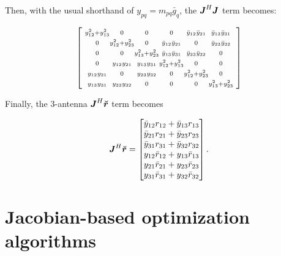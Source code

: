\documentclass[useAMS,usenatbib]{mn2e}
\newcommand{\mat}[1]{{\bmath{#1}}}
\newcommand{\JJ}{\mat{J}} %
\begin{document}
Then, with the usual shorthand of $y_{pq} = m_{pq} \bar{g}_q$, the
$\JJ^H\JJ$ term becomes:

\begin{equation}
\label{eq:JHJ:3ant}
\Matrix{@{~}c@{}c@{}c@{}c@{}c@{}c@{~}}{
\scriptstyle\yysq{12}{13} &\scriptstyle 0             &\scriptstyle 0             &\scriptstyle 0             &\scriptstyle \bb{1}{2}       &\scriptstyle \bb{1}{3} \\
\scriptstyle0             &\scriptstyle \yysq{12}{23} &\scriptstyle 0             &\scriptstyle \bb{1}{2}       &\scriptstyle 0             &\scriptstyle \bb{2}{3} \\
\scriptstyle0             &\scriptstyle 0             &\scriptstyle \yysq{13}{23} &\scriptstyle \bb{1}{3}       &\scriptstyle \bb{2}{3}       &\scriptstyle 0       \\
\scriptstyle0             &\scriptstyle \bbb{1}{2}      &\scriptstyle \bbb{1}{3}      &\scriptstyle \yysq{12}{13} &\scriptstyle 0             &\scriptstyle 0       \\ 
\scriptstyle\bbb{1}{2}      &\scriptstyle 0             &\scriptstyle \bbb{2}{3}      &\scriptstyle 0             &\scriptstyle \yysq{12}{23} &\scriptstyle 0 \\
\scriptstyle\bbb{1}{3}      &\scriptstyle \bbb{2}{3}      &\scriptstyle 0             &\scriptstyle 0             &\scriptstyle 0             &\scriptstyle  \yysq{13}{23} \\
}
\end{equation}

Finally, the 3-antenna $\JJ^H\Rr$ term becomes

\begin{equation}
\label{eq:JHR:3ant}
\JJ^H\Rr = \Matrix{c}{
\bar{y}_{12} r_{12} + \bar{y}_{13} r_{13} \\
\bar{y}_{21} r_{21} + \bar{y}_{23} r_{23} \\
\bar{y}_{31} r_{31} + \bar{y}_{32} r_{32} \\
y_{12} \bar{r}_{12} + y_{13} \bar{r}_{13}   \\
y_{21} \bar{r}_{21} + y_{23} \bar{r}_{23}   \\
y_{31} \bar{r}_{31} + y_{32} \bar{r}_{32}   \\
}.
\end{equation}

\section{Jacobian-based optimization algorithms}
\label{sec:algs}
\end{document}
